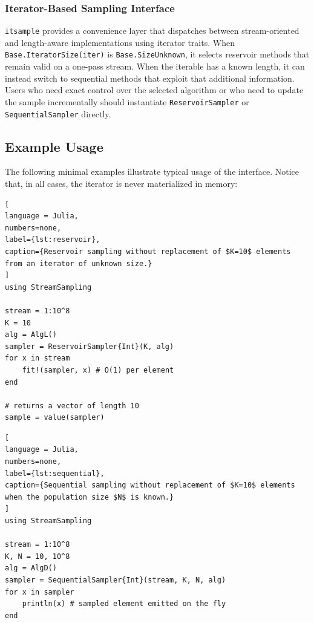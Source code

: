 \documentclass{juliacon}
\begin{document}
\subsubsection{Iterator-Based Sampling Interface}

\texttt{itsample} provides a convenience layer that dispatches between stream-oriented and length-aware implementations using iterator traits. When \texttt{Base.IteratorSize(iter)} is \texttt{Base.SizeUnknown}, it selects reservoir methods that remain valid on a one-pass stream. When the iterable has a known length, it can instead switch to sequential methods that exploit that additional information. Users who need exact control over the selected algorithm or who need to update the sample incrementally should instantiate \texttt{ReservoirSampler} or \texttt{SequentialSampler} directly.

\subsection{Example Usage}

The following minimal examples illustrate typical usage of the interface. Notice that, in all cases, the iterator is never materialized in memory:


\begin{lstlisting}[
language = Julia,
numbers=none,
label={lst:reservoir},
caption={Reservoir sampling without replacement of $K=10$ elements from an iterator of unknown size.}
]
using StreamSampling

stream = 1:10^8
K = 10
alg = AlgL()
sampler = ReservoirSampler{Int}(K, alg)
for x in stream
    fit!(sampler, x) # O(1) per element
end

# returns a vector of length 10
sample = value(sampler)
\end{lstlisting}

\vspace{-15pt}

\begin{lstlisting}[
language = Julia,
numbers=none,
label={lst:sequential},
caption={Sequential sampling without replacement of $K=10$ elements when the population size $N$ is known.}
]
using StreamSampling

stream = 1:10^8
K, N = 10, 10^8
alg = AlgD()
sampler = SequentialSampler{Int}(stream, K, N, alg)
for x in sampler
    println(x) # sampled element emitted on the fly
end
\end{lstlisting}
\end{document}
